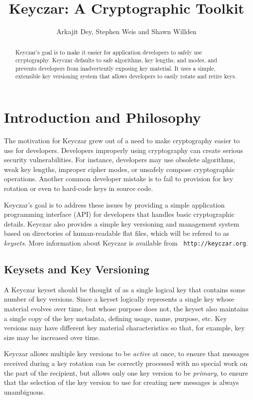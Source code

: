 \documentclass{llncs}
\title{Keyczar: A Cryptographic Toolkit}
\author{Arkajit Dey\inst{1}, Stephen Weis\inst{2} and Shawn
  Willden\inst{3} }
\institute{Massachusetts Institute of Technology, Cambridge, MA, USA 02139
\and
Google Inc., Mountain View, CA, USA 94043
\and
Google Inc., Boulder, CO, USA 80403}
\begin{document}
\maketitle

\begin{abstract}
Keyczar's goal is to make it easier for application developers to
safely use cryptography. Keyczar defaults to safe algorithms, key
lengths, and modes, and prevents developers from inadvertently
exposing key material. It uses a simple, extensible key versioning
system that allows developers to easily rotate and retire keys.
\end{abstract}

\section{Introduction and Philosophy}

The motivation for Keyczar grew out of a need to make cryptography
easier to use for developers. Developers improperly using cryptography
can create serious security vulnerabilities. For instance, developers
may use obsolete algorithms, weak key lengths, improper cipher modes,
or unsafely compose cryptographic operations. Another common developer
mistake is to fail to provision for key rotation or even to hard-code
keys in source code.

Keyczar's goal is to address these issues by providing a simple
application programming interface (API) for developers that handles
basic cryptographic details. Keyczar also provides a simple key
versioning and management system based on directories of
human-readable flat files, which will be refered to as
\emph{keysets}. More information about Keyczar is available from {\tt
  http://keyczar.org}.

\subsection{Keysets and Key Versioning}

A Keyczar keyset should be thought of as a single logical key that
contains some number of key versions. Since a keyset logically
represents a single key whose material evolves over time, but whose
purpose does not, the keyset also maintains a single copy of the key
metadata, defining usage, name, purpose, etc.  Key versions may have
different key material characteristics so that, for example, key size
may be increased over time.

Keyczar allows multiple key versions to be \emph{active} at once, to
ensure that messages received during a key rotation can be correctly
processed with no special work on the part of the recipient, but
allows only one key version to be \emph{primary}, to ensure that the
selection of the key version to use for creating new messages is
always unambiguous.
\end{document}
